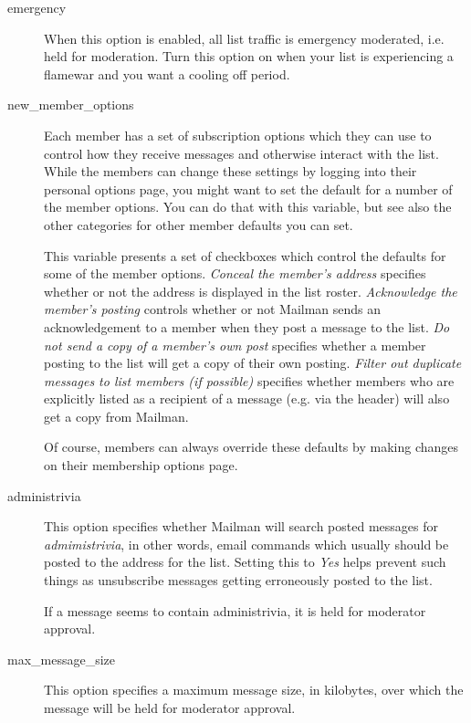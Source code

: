 \documentclass{howto}
\begin{document}
\begin{description}
\item[emergency]
    When this option is enabled, all list traffic is emergency
    moderated, i.e. held for moderation.  Turn this option on when
    your list is experiencing a flamewar and you want a cooling off
    period.

\item[new_member_options]
    Each member has a set of subscription options which they can use
    to control how they receive messages and otherwise interact with
    the list.  While the members can change these settings by logging
    into their personal options page, you might want to set the
    default for a number of the member options.  You can do that with
    this variable, but see also the other categories for other member
    defaults you can set.

    This variable presents a set of checkboxes which control the
    defaults for some of the member options.  \emph{Conceal the
    member's address} specifies whether or not the address is
    displayed in the list roster.  \emph{Acknowledge the member's
    posting} controls whether or not Mailman sends an acknowledgement
    to a member when they post a message to the list.  \emph{Do not
    send a copy of a member's own post} specifies whether a member
    posting to the list will get a copy of their own posting.
    \emph{Filter out duplicate messages to list members (if possible)}
    specifies whether members who are explicitly listed as a recipient
    of a message (e.g. via the  header) will also get a
    copy from Mailman.

    Of course, members can always override these defaults by making
    changes on their membership options page.

\item[administrivia]
    This option specifies whether Mailman will search posted messages
    for \emph{admimistrivia}, in other words, email commands which
    usually should be posted to the  address for the
    list.  Setting this to \emph{Yes} helps prevent such things as
    unsubscribe messages getting erroneously posted to the list.

    If a message seems to contain administrivia, it is held for
    moderator approval.

\item[max_message_size]
    This option specifies a maximum message size, in kilobytes, over
    which the message will be held for moderator approval.


\end{description}
\end{document}
